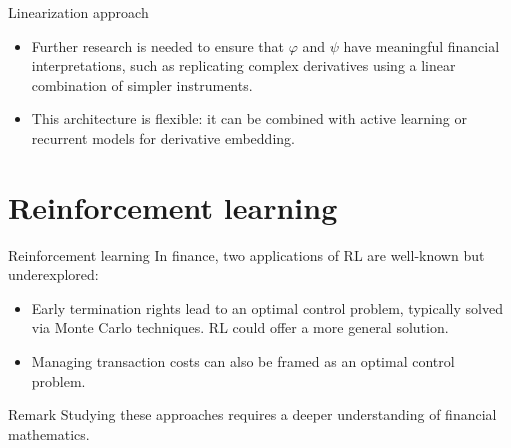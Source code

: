 \documentclass[10pt]{beamer}
\renewcommand{\phi}{\varphi}
\begin{document}
    \begin{frame}{Linearization approach}
        \begin{itemize}
            \item Further research is needed to ensure that $\phi$ and $\psi$ have meaningful financial interpretations,
            such as replicating complex derivatives using a linear combination of simpler instruments.
            \item This architecture is flexible: it can be combined with active learning or recurrent models for derivative embedding.
        \end{itemize}
    \end{frame}

    \section{Reinforcement learning}
    \begin{frame}{Reinforcement learning}
        In finance, two applications of RL are well-known but underexplored:
        \begin{itemize}
            \item Early termination rights lead to an optimal control problem, typically solved via Monte Carlo techniques. RL could offer a more general solution.
            \item Managing transaction costs can also be framed as an optimal control problem.
        \end{itemize}

        \begin{block}{Remark}
            Studying these approaches requires a deeper understanding of financial mathematics.
        \end{block}
    \end{frame}
\end{document}

